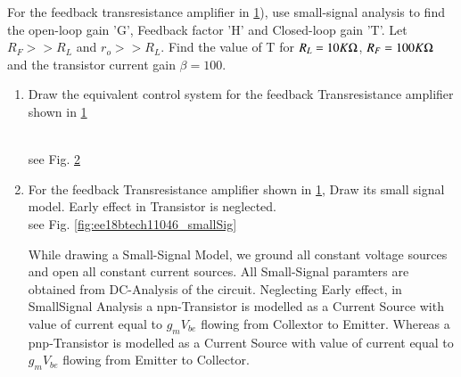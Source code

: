 For the feedback transresistance amplifier in \ref{fig:ee18btech11046_Question}), use small-signal analysis to find the open-loop gain 'G', Feedback factor 'H' and Closed-loop gain 'T'. Let $R_{F}>>R_{L}$ and $r_{o}>>R_{L}$. Find the value of T for $R_{L}=10K\ohm$, $R_{F}=100K\ohm$ and the transistor current gain $\beta = 100$.
\begin{enumerate}[label=\thesection.\arabic*.,ref=\thesection.\theenumi]
\item Draw the equivalent control system for the feedback Transresistance amplifier shown in \ref{fig:ee18btech11046_Question}
\renewcommand{\thefigure}{\theenumi.\arabic{figure}}
\begin{figure}[h!]
	\begin{center}
		\resizebox{\columnwidth/1}{!}{}
	\end{center}
	\caption{}
	\label{fig:ee18btech11046_Question}
\end{figure}
\\

%
\solution see Fig. \ref{fig:ee18btech11046_ControlSystem}
\begin{figure}[ht!]
	\begin{center}
		\resizebox{\columnwidth}{!}{}
	\end{center}
	\caption{}
	\label{fig:ee18btech11046_ControlSystem}
\end{figure}
\renewcommand{\thefigure}{\theenumi}

%

\item For the feedback Transresistance amplifier shown in \ref{fig:ee18btech11046_Question}, Draw its small signal model. Early effect in Transistor is neglected.
\\

%
\solution see Fig. \ref {fig:ee18btech11046_smallSig}

While drawing a Small-Signal Model, we
ground all constant voltage sources and open
all constant current sources. All Small-Signal
paramters are obtained from DC-Analysis of
the circuit. Neglecting Early effect, in SmallSignal Analysis a npn-Transistor is modelled as
a Current Source with value of current equal to
$g_{m}V_{be}$ flowing from Collextor to Emitter. Whereas
a pnp-Transistor is modelled as a Current Source
with value of current equal to $g_{m}V_{be}$ flowing
from Emitter to Collector.


\end{enumerate}
